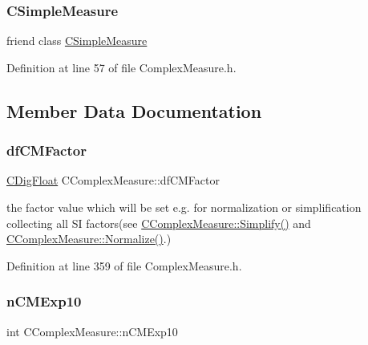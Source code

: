 \subsubsection{\texorpdfstring{C\+Simple\+Measure}{CSimpleMeasure}}
{\footnotesize\ttfamily friend class \hyperlink{classCSimpleMeasure}{C\+Simple\+Measure}\hspace{0.3cm}{\ttfamily [friend]}}



Definition at line 57 of file Complex\+Measure.\+h.



\subsection{Member Data Documentation}
\mbox{\label{classCComplexMeasure_a21eecd9fd837fb73da2e6994b6c3fefe}} 
\subsubsection{\texorpdfstring{df\+C\+M\+Factor}{dfCMFactor}}
{\footnotesize\ttfamily \hyperlink{classCDigFloat}{C\+Dig\+Float} C\+Complex\+Measure\+::df\+C\+M\+Factor\hspace{0.3cm}{\ttfamily [protected]}}



the factor value which will be set e.\+g. for normalization or simplification collecting all SI factors(see \hyperlink{classCComplexMeasure_addb4e69033f2c32fb3bf4a3aef5e1470}{C\+Complex\+Measure\+::\+Simplify()} and \hyperlink{classCComplexMeasure_a87cc1f3c3f0dafd7cbe00634124c8d46}{C\+Complex\+Measure\+::\+Normalize()}.) 



Definition at line 359 of file Complex\+Measure.\+h.

\mbox{\label{classCComplexMeasure_a52cfbd26747c0497cfe97c56f2ff38ea}} 
\subsubsection{\texorpdfstring{n\+C\+M\+Exp10}{nCMExp10}}
{\footnotesize\ttfamily int C\+Complex\+Measure\+::n\+C\+M\+Exp10\hspace{0.3cm}{\ttfamily [protected]}}



